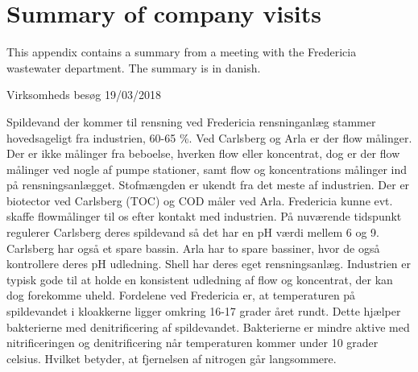 \section{Summary of company visits}\label{app:resume}
This appendix contains a summary from a meeting with the Fredericia wastewater department. The summary is in danish. 

Virksomheds besøg 19/03/2018 

Spildevand der kommer til rensning ved Fredericia rensninganlæg stammer hovedsageligt fra industrien, 60-65 \%. Ved Carlsberg og Arla er der flow målinger. Der er ikke målinger fra beboelse, hverken flow eller koncentrat, dog er der flow målinger ved nogle af pumpe stationer, samt flow og koncentrations målinger ind på rensningsanlægget. Stofmængden er ukendt fra det meste af industrien. Der er biotector ved Carlsberg (TOC) og COD måler ved Arla. Fredericia kunne evt. skaffe flowmålinger til os efter kontakt med industrien. 
På nuværende tidspunkt regulerer Carlsberg deres spildevand så det har en pH værdi mellem 6 og 9. Carlsberg har også et spare bassin. Arla har to spare bassiner, hvor de også kontrollere deres pH udledning. Shell har deres eget rensningsanlæg.
Industrien er typisk gode til at holde en konsistent udledning af flow og koncentrat, der kan dog forekomme uheld. Fordelene ved Fredericia er, at temperaturen på spildevandet i kloakkerne ligger omkring 16-17 grader året rundt. Dette hjælper bakterierne med denitrificering af spildevandet. Bakterierne er mindre aktive med nitrificeringen og denitrificering når temperaturen kommer under 10 grader celsius. Hvilket betyder, at fjernelsen af nitrogen går langsommere. 
